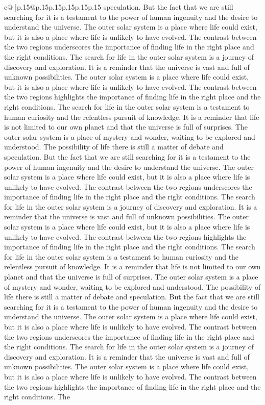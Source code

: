 \documentclass{article}
\begin{document}
{\begin{supertabular}{c@{$\;$}|p{.15\linewidth}@{}p{.15\linewidth}p{.15\linewidth}p{.15\linewidth}p{.15\linewidth}p{.15\linewidth}}
{{{speculation. But the fact that we are still searching for it is a testament to the power of human ingenuity and the desire to understand the universe. The outer solar system is a place where life could exist, but it is also a place where life is unlikely to have evolved. The contrast between the two regions underscores the importance of finding life in the right place and the right conditions. The search for life in the outer solar system is a journey of discovery and exploration. It is a reminder that the universe is vast and full of unknown possibilities. The outer solar system is a place where life could exist, but it is also a place where life is unlikely to have evolved. The contrast between the two regions highlights the importance of finding life in the right place and the right conditions. The search for life in the outer solar system is a testament to human curiosity and the relentless pursuit of knowledge. It is a reminder that life is not limited to our own planet and that the universe is full of surprises. The outer solar system is a place of mystery and wonder, waiting to be explored and understood. The possibility of life there is still a matter of debate and speculation. But the fact that we are still searching for it is a testament to the power of human ingenuity and the desire to understand the universe. The outer solar system is a place where life could exist, but it is also a place where life is unlikely to have evolved. The contrast between the two regions underscores the importance of finding life in the right place and the right conditions. The search for life in the outer solar system is a journey of discovery and exploration. It is a reminder that the universe is vast and full of unknown possibilities. The outer solar system is a place where life could exist, but it is also a place where life is unlikely to have evolved. The contrast between the two regions highlights the importance of finding life in the right place and the right conditions. The search for life in the outer solar system is a testament to human curiosity and the relentless pursuit of knowledge. It is a reminder that life is not limited to our own planet and that the universe is full of surprises. The outer solar system is a place of mystery and wonder, waiting to be explored and understood. The possibility of life there is still a matter of debate and speculation. But the fact that we are still searching for it is a testament to the power of human ingenuity and the desire to understand the universe. The outer solar system is a place where life could exist, but it is also a place where life is unlikely to have evolved. The contrast between the two regions underscores the importance of finding life in the right place and the right conditions. The search for life in the outer solar system is a journey of discovery and exploration. It is a reminder that the universe is vast and full of unknown possibilities. The outer solar system is a place where life could exist, but it is also a place where life is unlikely to have evolved. The contrast between the two regions highlights the importance of finding life in the right place and the right conditions. The }}}
\end{supertabular}}
\end{document}

